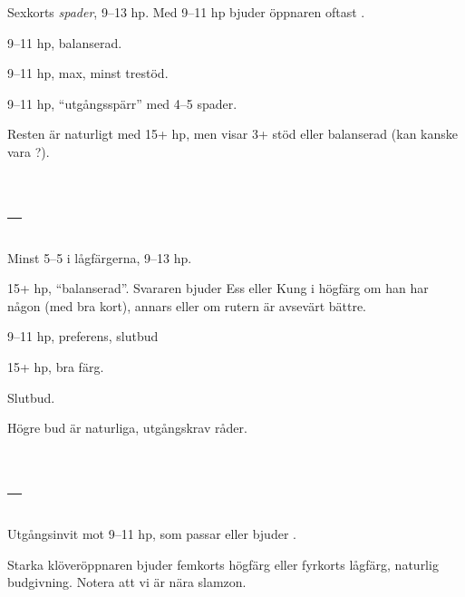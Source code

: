 Sexkorts \emph{spader}, 9--13 hp. Med 9--11 hp bjuder öppnaren 
oftast .

\bbe
\item[\spa{2}] 9--11 hp, balanserad.
\item[\spa{3}] 9--11 hp, max, minst trestöd.
\item[\spa{4}] 9--11 hp, ``utgångsspärr'' med 4--5 spader.
\ebe

Resten är naturligt med 15+ hp, men  visar 3+ stöd eller balanserad
(kan kanske vara ?).


\section{ -- } \nytt

Minst 5--5 i lågfärgerna, 9--13 hp.

\bbe
\item[\NT{2}] 15+ hp, ``balanserad''. Svararen bjuder Ess eller Kung i
  högfärg om han har någon (med bra kort), annars  eller  om
  rutern är avsevärt bättre.
\item[\la{3}] 9--11 hp, preferens, slutbud
\item[\ho{3}] 15+ hp, bra färg.
\item[\NT{3}] Slutbud.
  \ebe

Högre bud är naturliga, utgångskrav råder.  
  
\section{ -- } \nytt

Utgångsinvit mot 9--11 hp, som passar eller bjuder .

Starka
klöveröppnaren bjuder femkorts högfärg eller fyrkorts lågfärg, naturlig
budgivning. Notera att vi är nära slamzon.
 

